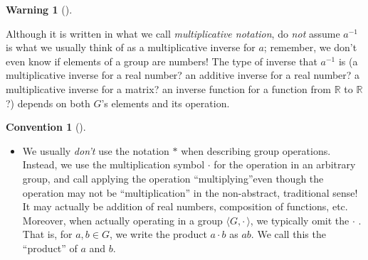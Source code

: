 \documentclass[10pt,]{book}
\theoremstyle{plain}
\theoremstyle{definition}
\theoremstyle{definition}
\newtheorem{convention}[theorem]{Convention}
\newtheorem{warning}[theorem]{Warning}
\theoremstyle{definition}
\theoremstyle{definition}
\numberwithin{equation}{section}
\def\R{\mathbb{R}}
\begin{document}
%
\begin{warning}[]\label{warning-6}

              Although it is written in what we call  \emph{multiplicative
              notation}, do \emph{not} assume \(a^{-1}\) is what we usually think of as a
              multiplicative inverse for \(a\); remember, we don't even know if
              elements of a group are numbers! The type of inverse that \(a^{-1}\)
              is (a multiplicative inverse for a real number? an additive inverse
              for a real number? a multiplicative inverse for a matrix? an inverse
              function for a function from \(\R\) to \(\R\)?) depends on both
              \(G\)'s elements and its operation.
\end{warning}
\begin{convention}[]\label{convention-1}
\leavevmode%
\begin{itemize}[label=\textbullet]
\item{} We usually \emph{don't} use the notation \(*\) when describing group
          operations. Instead, we use the multiplication symbol \(\cdot\) for
          the operation in an arbitrary group, and  call
          applying the operation ``multiplying''\textemdash{}even though the operation may
          not be ``multiplication'' in the non-abstract, traditional sense! It may
          actually be addition of real numbers, composition of
          functions, etc. Moreover, when actually operating in a group \(\langle G, \cdot\,\rangle\), we
          typically omit the \(\cdot\) . That is, for \(a,b\in G\), we write the
          product \(a\cdot b\) as \(ab\). We call this the ``product'' of \(a\) and \(b\). %
\par


\end{itemize}
\end{convention}
\end{document}
